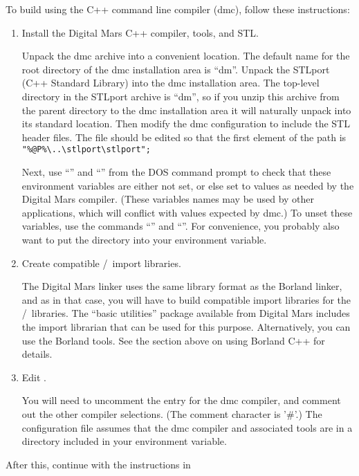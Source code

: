 To build using the  C++ 
command line compiler (dmc), follow these instructions:
\begin{enumerate}
\item Install the Digital Mars C++ compiler, tools, and STL.

  Unpack the dmc archive into a convenient location.  The default name
  for the root directory of the dmc installation area is ``dm''.  Unpack
  the STLport (C++ Standard Library) into the dmc installation area.
  The top-level directory in the STLport archive is ``dm'', so if you
  unzip this archive from the parent directory to the dmc installation
  area it will naturally unpack into its standard location.  Then modify
  the dmc configuration to include the STL header files.  The
   file should be edited so that the first
  element of the  path is \verb+"%@P%\..\stlport\stlport";+

  Next, use ``'' and ``'' from the DOS
  command prompt to check that these environment variables are either
  not set, or else set to values as needed by the Digital Mars compiler.
  (These variables names may be used by other applications, which will
  conflict with values expected by dmc.)  To unset these variables, use
  the commands ``'' and ``''.  For
  convenience, you probably also want to put the 
  directory into your environment  variable.

\item Create compatible \Tcl/\Tk\ import libraries.

  The Digital Mars linker uses the same library format as the Borland
  linker, and as in that case, you will have to build compatible
  import libraries for the \Tcl/\Tk\ libraries.  The ``basic
  utilities'' package available from Digital Mars includes the
   import librarian that can be used for this purpose.
  Alternatively, you can use the Borland tools.  See the section above
  on using Borland C++ for details.

\item Edit .

  You will need to uncomment the entry for the dmc compiler, and comment
  out the other compiler selections.  (The comment character is '\#'.)
  The configuration file assumes that the dmc compiler and associated
  tools are in a directory included in your environment 
  variable.

\end{enumerate}
After this, continue with the instructions in 
 

